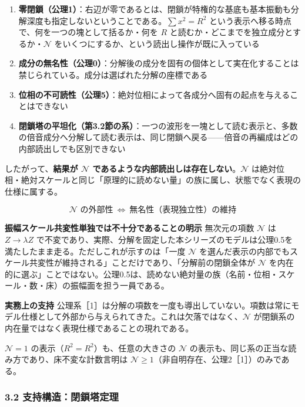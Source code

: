 \documentclass[
  a4paper,
]{ltjsarticle}
\providecommand{\tightlist}{%
  \setlength{\itemsep}{0pt}\setlength{\parskip}{0pt}}
\begin{document}
\begin{enumerate}
\def\labelenumi{\arabic{enumi}.}
\tightlist
\item
  \textbf{零閉鎖（公理1）}：右辺が零であるとは、閉鎖が特権的な基底も基本振動も分解深度も指定しないということである。\(\sum x^2=R^2\)
  という表示へ移る時点で、何を一つの塊として括るか・何を \(R\)
  と読むか・どこまでを独立成分とするか・\(\mathcal N\)
  をいくつにするか、という読出し操作が既に入っている
\item
  \textbf{成分の無名性（公理0）}：分解後の成分を固有の個体として実在化することは禁じられている。成分は選ばれた分解の座標である
\item
  \textbf{位相の不可読性（公理5）}：絶対位相によって各成分へ固有の起点を与えることはできない
\item
  \textbf{閉鎖塔の平坦化（第3.2節の系）}：一つの波形を一塊として読む表示と、多数の倍音成分へ分解して読む表示は、同じ閉鎖へ戻る------倍音の再編成はどの内部読出しでも区別できない
\end{enumerate}

したがって、\textbf{結果が \(\mathcal N\)
であるような内部読出しは存在しない}。\(\mathcal N\)
は絶対位相・絶対スケールと同じ「原理的に読めない量」の族に属し、状態でなく表現の仕様に属する。

\[
\boxed{\ \mathcal N\text{ の外部性}\ \Longleftrightarrow\ \text{無名性（表現独立性）の維持}\ }
\]

\textbf{振幅スケール共変性単独では不十分であることの明示} 無次元の項数
\(\mathcal N\) は \(Z\to\lambda Z\)
で不変であり、実際、分解を固定した本シリーズのモデルは公理0.5を満たしたまま走る。ただしこれが示すのは「一度
\(\mathcal N\)
を選んだ表示の内部でもスケール共変性が維持される」ことだけであり、「分解前の閉鎖全体が
\(\mathcal N\)
を内在的に選ぶ」ことではない。公理0.5は、読めない絶対量の族（名前・位相・スケール・数・床）の振幅面を担う一員である。

\textbf{実務上の支持}
公理系［1］は分解の項数を一度も導出していない。項数は常にモデル仕様として外部から与えられてきた。これは欠落ではなく、\(\mathcal N\)
が閉鎖系の内在量ではなく表現仕様であることの現れである。

\(\mathcal N=1\) の表示（\(R^2=R^2\)）も、任意の大きさの \(\mathcal N\)
の表示も、同じ系の正当な読み方であり、床不変な計数言明は
\(\mathcal N\ge1\)（非自明存在、公理2［1］）のみである。

\subsubsection{3.2
支持構造：閉鎖塔定理}\label{ux652fux6301ux69cbux9020ux9589ux9396ux5854ux5b9aux7406}
\end{document}
